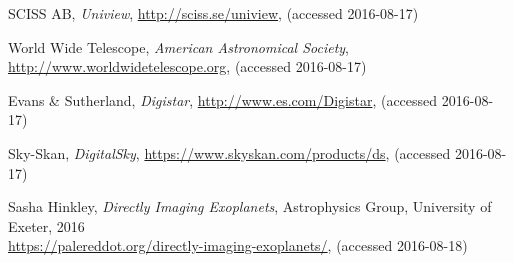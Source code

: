 \begin{thebibliography}{99}
  SCISS AB,
  \emph{Uniview},
  \url{http://sciss.se/uniview},
  (accessed 2016-08-17)
  
  World Wide Telescope,
  \emph{American Astronomical Society},
  \url{http://www.worldwidetelescope.org},
  (accessed 2016-08-17)
  
  Evans \& Sutherland,
  \emph{Digistar},
  \url{http://www.es.com/Digistar},
  (accessed 2016-08-17)
    
  Sky-Skan,
  \emph{DigitalSky},
  \url{https://www.skyskan.com/products/ds},
  (accessed 2016-08-17)
    
  Sasha Hinkley,
  \emph{Directly Imaging Exoplanets},
  Astrophysics Group, University of Exeter,
  2016 \\
  \url{https://palereddot.org/directly-imaging-exoplanets/},
  (accessed 2016-08-18)
  
\end{thebibliography}
